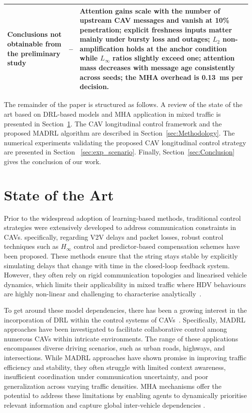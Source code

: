 \documentclass{ieeeaccess}
\begin{document}
\begin{table}[htbp]
\begin{tabularx}{\textwidth}{|p{3.1cm}|X|X|}
Conclusions not obtainable from the preliminary study & -- & Attention gains scale with the number of upstream CAV messages and vanish at 10\% penetration; explicit freshness inputs matter mainly under bursty loss and outages; $L_2$ non-amplification holds at the anchor condition while $L_\infty$ ratios slightly exceed one; attention mass decreases with message age consistently across seeds; the MHA overhead is 0.13~ms per decision. \\ \hline %
\end{tabularx}
\end{table}



The remainder of the paper is structured as follows. A review of the state of the art based on DRL-based models and MHA application in mixed traffic is presented in Section~\ref{sec:STA}. The CAV longitudinal control framework and the proposed MADRL algorithm are described in Section~\ref{sec:Methodology}. The numerical experiments validating the proposed CAV longitudinal control strategy are presented in Section ~\ref{sec:exp_scenario}. Finally, Section~\ref{sec:Conclusion} gives the conclusion of our work.

\section{State of the Art}
\label{sec:STA}

Prior to the widespread adoption of learning-based methods, traditional control strategies were extensively developed to address communication constraints in CAVs. specifically, regarding V2V delays and packet losses, robust control techniques such as $H_\infty$ control \cite{YANG2025103212} and predictor-based compensation schemes \cite{WEI201796} have been proposed. These methods ensure that the string stays stable by explicitly simulating delays that change with time in the closed-loop feedback system. However, they often rely on rigid communication topologies and linearised vehicle dynamics, which limits their applicability in mixed traffic where HDV behaviours are highly non-linear and challenging to characterise analytically~\cite{findeisen2002introduction, Li2019}.

To get around these model dependencies, there has been a growing interest in the incorporation of DRL within the control systems of CAVs~\cite{Kiran2022_Survey, 11152633}.  Specifically, MADRL approaches have been investigated to facilitate collaborative control among numerous CAVs within intricate environments. The range of these applications encompasses diverse driving scenarios, such as urban roads, highways, and intersections.  While MADRL approaches have shown promise in improving traffic efficiency and stability, they often struggle with limited context awareness, insufficient coordination under communication uncertainty, and poor generalization across varying traffic densities. MHA mechanisms offer the potential to address these limitations by enabling agents to dynamically prioritise relevant information and capture global inter-vehicle dependencies \cite{wang2024hypergraph}.
\end{document}

